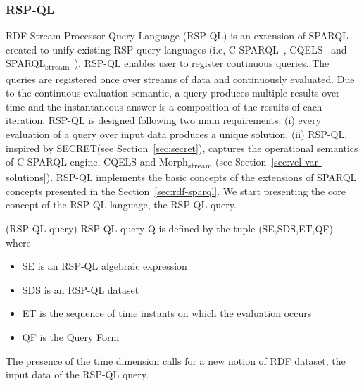 \subsubsection{RSP-QL} \label{sec:rsp-ql}
RDF Stream Processor Query Language (RSP-QL) \cite{DBLP:journals/ijswis/DellAglioVCC14} is an extension of SPARQL created to unify existing RSP query languages (i.e, C-SPARQL~\cite{DBLP:journals/ijsc/BarbieriBCVG10}, CQELS~\cite{DBLP:conf/semweb/PhuocDPH11} and SPARQL\textsubscript{stream}~\cite{DBLP:journals/semweb/AnicicRFS12}).
RSP-QL enables user to register continuous queries. The queries are registered once over streams of data and continuously evaluated. Due to the continuous evaluation semantic, a query produces multiple results over time and the instantaneous answer is a composition of the results of each iteration.
RSP-QL is designed following two main requirements: (i) every evaluation of a query over input data produces a unique solution, (ii) RSP-QL, inspired by SECRET(see Section~\ref{sec:secret}), captures the operational semantics of C-SPARQL engine, CQELS and Morph\textsubscript{stream} (see Section~\ref{sec:vel-var-solutions}).
RSP-QL implements the basic concepts of the extensions of SPARQL concepts presented in the Section~\ref{sec:rdf-sparql}.
We start presenting the core concept of the RSP-QL language, the RSP-QL query.

\begin{Definition}
(RSP-QL query) RSP-QL query Q is defined by the tuple (SE,SDS,ET,QF) where
\begin{itemize}
\item SE is an RSP-QL algebraic expression
\item SDS is an RSP-QL dataset
\item ET is the sequence of time instants on which the evaluation occurs
\item QF is the Query Form
\end{itemize}
\end{Definition}

The presence of the time dimension calls for a new notion of RDF dataset, the input data of the RSP-QL query. 

